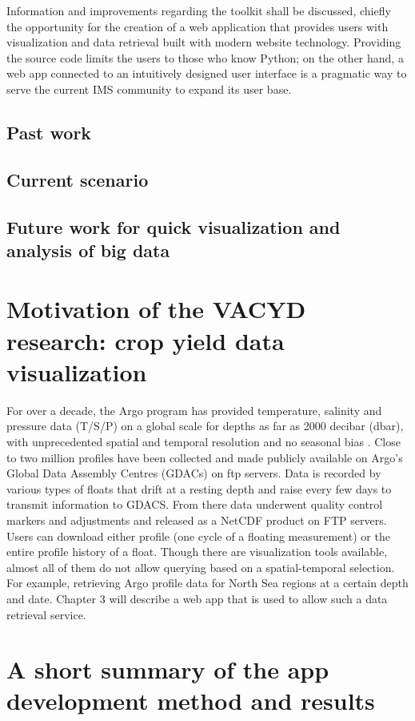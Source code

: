 Information and improvements regarding the toolkit shall be discussed, chiefly the opportunity for the creation of a web application that provides users with visualization and data retrieval built with modern website technology. Providing the source code limits the users to those who know Python; on the other hand, a web app connected to an intuitively designed user interface is a pragmatic way to serve the current IMS community to expand its user base.


\subsection{Past work}
\subsection{Current scenario}
\subsection{Future work for quick visualization and analysis of big data}



\section{Motivation of the VACYD research: crop yield data visualization}

For over a decade, the Argo program has provided temperature, salinity and pressure data (T/S/P) on a global scale for depths as far as 2000 decibar (dbar), with unprecedented spatial and temporal resolution and no seasonal bias \cite{argo}. Close to two million profiles have been collected and made publicly available on Argo’s Global Data Assembly Centres (GDACs) on \gls{ftp} servers. Data is recorded by various types of floats that drift at a resting depth and raise every few days to transmit information to GDACS. From there data underwent quality control markers and adjustments and released as a \gls{NetCDF} product on FTP servers. Users can download either profile (one cycle of a floating measurement) or the entire profile history of a float. Though there are visualization tools available, almost all of them do not allow querying based on a spatial-temporal selection. For example, retrieving Argo profile data for North Sea regions at a certain depth and date. Chapter 3 will describe a web app that is used to allow such a data retrieval service.

\section{A short summary of the app development method and results}

